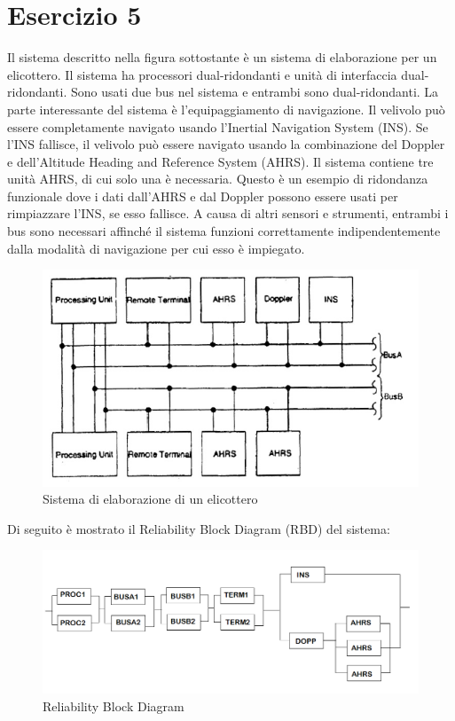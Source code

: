	\section{Esercizio 5}
	Il sistema descritto nella figura sottostante è un sistema di elaborazione per un elicottero. Il sistema ha processori dual-ridondanti e unità di interfaccia dual-ridondanti. Sono usati due bus nel sistema e entrambi sono dual-ridondanti. La parte interessante del sistema è l'equipaggiamento di navigazione. Il velivolo può essere completamente navigato usando l'Inertial Navigation System (INS). Se l'INS fallisce, il velivolo può essere navigato usando la combinazione del Doppler e dell'Altitude Heading and Reference System (AHRS). Il sistema contiene tre unità AHRS, di cui solo una è necessaria. Questo è un esempio di ridondanza funzionale dove i dati dall'AHRS e dal Doppler possono essere usati per rimpiazzare l'INS, se esso fallisce. A causa di altri sensori e strumenti, entrambi i bus sono necessari affinché il sistema funzioni correttamente indipendentemente dalla modalità di navigazione per cui esso è impiegato.
	
	\begin{figure}[H]
		\centering
		\includegraphics[scale=0.8]{./immagine/reliability_es5.png}
		\caption{Sistema di elaborazione di un elicottero}
		\label{fig:reliability_es5}
	\end{figure}
	
	Di seguito è mostrato il Reliability Block Diagram (RBD) del sistema:
	
	\begin{figure}[H]
		\centering
		\includegraphics[scale=0.45]{./immagine/rbd_es5.png}
		\caption{Reliability Block Diagram}
		\label{fig:rbd_es5}
	\end{figure}
	
